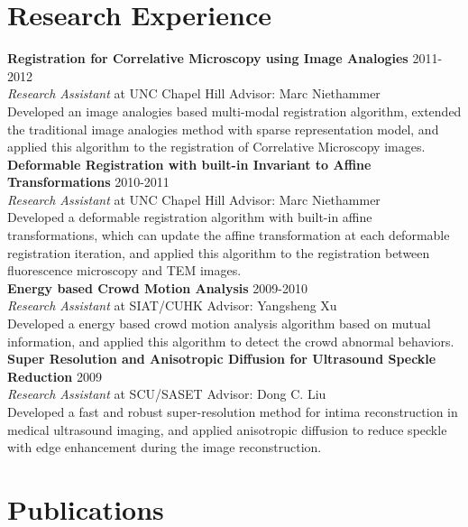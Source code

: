 \documentclass[line,margin]{res}
\begin{document}
\begin{resume}
 
\section{\sc Research Experience} 
\smallskip

\textbf{Registration for Correlative Microscopy using Image Analogies} \hfill      2011-2012 \\
\textit{ Research Assistant} at UNC Chapel Hill  \hfill {Advisor: Marc Niethammer}\\
Developed an image analogies based multi-modal registration algorithm, extended the traditional image analogies method with sparse representation model, and applied this algorithm to the registration of Correlative Microscopy images.
\smallskip \\
\textbf{Deformable Registration with built-in Invariant to Affine Transformations} \hfill      2010-2011 \\
\textit{ Research Assistant} at UNC Chapel Hill \hfill {Advisor: Marc Niethammer}\\
Developed a deformable registration algorithm with built-in affine transformations, which can update the affine transformation at each deformable registration iteration, and
applied this algorithm to the registration between fluorescence microscopy and TEM images.
\smallskip \\
\textbf{Energy based Crowd Motion Analysis} \hfill      2009-2010 \\
\textit{Research Assistant} at SIAT/CUHK \hfill {Advisor: Yangsheng Xu}\\
Developed a energy based crowd motion analysis algorithm based on mutual information, and
applied this algorithm to detect the crowd abnormal behaviors.
\smallskip \\
\textbf{Super Resolution and Anisotropic Diffusion for Ultrasound Speckle Reduction} \hfill      2009 \\
\textit{Research Assistant} at SCU/SASET \hfill {Advisor: Dong C. Liu}\\
Developed a fast and robust super-resolution method for intima reconstruction in medical
ultrasound imaging, and applied anisotropic diffusion to reduce speckle with edge enhancement during the image reconstruction.

\section{\sc Publications}  


\end{resume}
\end{document}
